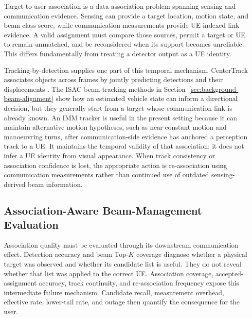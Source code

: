 Target-to-user association is a data-association problem spanning sensing and
communication evidence.  Sensing can provide a target location, motion state,
and beam-class score, while communication measurements provide UE-indexed link
evidence.  A valid assignment must compare those sources, permit a target or UE
to remain unmatched, and be reconsidered when its support becomes unreliable.
This differs fundamentally from treating a detector output as a UE identity.

Tracking-by-detection supplies one part of this temporal mechanism.  CenterTrack
associates objects across frames by jointly predicting detections and their
displacements \cite{zhou2020trackingobjectspoints}.  The ISAC beam-tracking
methods in Section~\ref{sec:background-beam-alignment} show how an estimated
vehicle state can inform a directional decision, but they generally start from
a target whose communication link is already known.  An IMM tracker is useful
in the present setting because it can maintain alternative motion hypotheses,
such as near-constant motion and manoeuvring turns, after communication-side
evidence has anchored a perception track to a UE.  It maintains the temporal
validity of that association; it does not infer a UE identity from visual
appearance.  When track consistency or association confidence is lost, the
appropriate action is re-association using communication measurements rather
than continued use of outdated sensing-derived beam information.

\subsection{Association-Aware Beam-Management Evaluation}
\label{subsec:background-association-aware-evaluation}

Association quality must be evaluated through its downstream communication
effect.  Detection accuracy and beam Top-$K$ coverage diagnose whether a
physical target was observed and whether its candidate list is useful.  They do
not reveal whether that list was applied to the correct UE.  Association
coverage, accepted-assignment accuracy, track continuity, and re-association
frequency expose this intermediate failure mechanism.  Candidate recall,
measurement overhead, effective rate, lower-tail rate, and outage then quantify
the consequence for the user.

